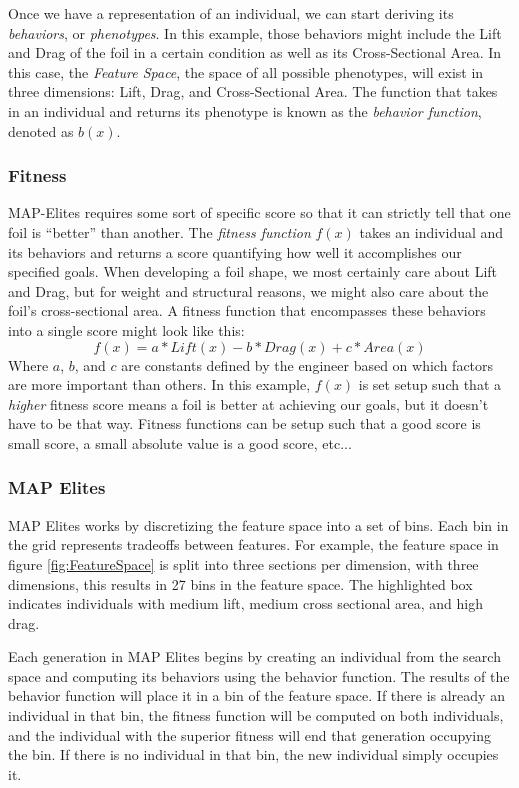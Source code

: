 \documentclass{sig-alternate}
\begin{document}
Once we have a representation of an individual, we can start deriving its \textit{behaviors}, or \textit{phenotypes}.
In this example, those behaviors might include the Lift and Drag of the foil in a certain condition as well as its Cross-Sectional Area.
In this case, the \textit{Feature Space}, the space of all possible phenotypes, will exist in three dimensions: Lift, Drag, and Cross-Sectional Area.
The function that takes in an individual and returns its phenotype is known as the \textit{behavior function}, denoted as $b(x)$.

\subsubsection{Fitness}
\label{sec:fitness}

MAP-Elites requires some sort of specific score so that it can strictly tell that one foil is ``better'' than another.
The \textit{fitness function} $f(x)$ takes an individual and its behaviors and returns a score quantifying how well it accomplishes our specified goals.
When developing a foil shape, we most certainly care about Lift and Drag, but for weight and structural reasons, we might also care about the foil's cross-sectional area.
A fitness function that encompasses these behaviors into a single score might look like this:
$$f(x) = a*\textit{Lift}(x) - b *Drag(x) + c*Area(x)$$
Where $a$, $b$, and $c$ are constants defined by the engineer based on which factors are more important than others.
In this example, $f(x)$ is set setup such that a \textit{higher} fitness score means a foil is better at achieving our goals, but it doesn't have to be that way.
Fitness functions can be setup such that a good score is small score, a small absolute value is a good score, etc...

\subsubsection{MAP Elites}

MAP Elites works by discretizing the feature space into a set of bins.
Each bin in the grid represents tradeoffs between features.
For example, the feature space in figure \ref{fig:FeatureSpace} is split into three sections per dimension, with three dimensions, this results in 27 bins in the feature space.
The highlighted box indicates individuals with medium lift, medium cross sectional area, and high drag.

Each generation in MAP Elites begins by creating an individual from the search space and computing its behaviors using the behavior function.
The results of the behavior function will place it in a bin of the feature space.
If there is already an individual in that bin, the fitness function will be computed on both individuals, and the individual with the superior fitness will end that generation occupying the bin.
If there is no individual in that bin, the new individual simply occupies it.
\end{document}
